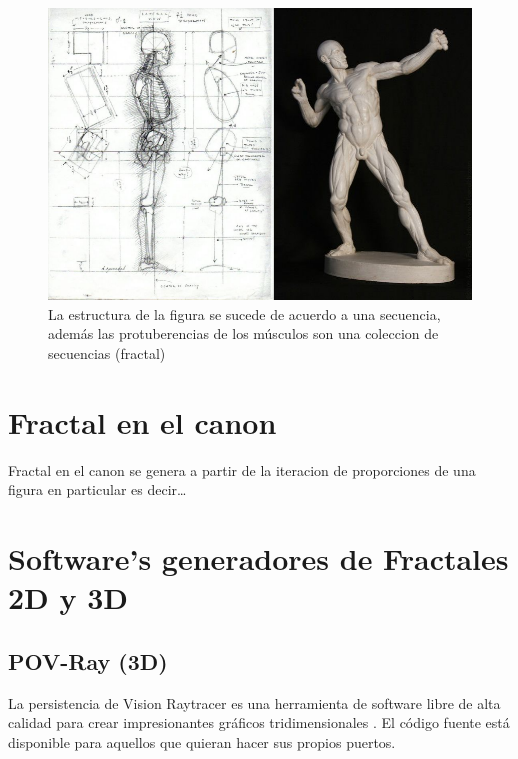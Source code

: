 \documentclass[
  11pt,
]{krantz}
\theoremstyle{definition}
\theoremstyle{definition}
\theoremstyle{definition}
\theoremstyle{definition}
\theoremstyle{remark}
\begin{document}
\begin{figure}[!ht]

{\centering \includegraphics[width=1\linewidth]{body2} 

}

\caption{La estructura de la figura se sucede de acuerdo a una secuencia, además las protuberencias de los músculos son una coleccion de secuencias (fractal)}\label{fig:body2}
\end{figure}

\hypertarget{fractal-en-el-canon}{%
\section{Fractal en el canon}\label{fractal-en-el-canon}}

Fractal en el canon se genera a partir de la iteracion de proporciones de una figura en particular es decir\ldots{}

\hypertarget{softwares-generadores-de-fractales-2d-y-3d}{%
\section{Software's generadores de Fractales 2D y 3D}\label{softwares-generadores-de-fractales-2d-y-3d}}

\hypertarget{pov-ray-3d}{%
\subsection{POV-Ray (3D)}\label{pov-ray-3d}}

La persistencia de Vision Raytracer es una herramienta de software libre de alta calidad para crear impresionantes gráficos tridimensionales . El código fuente está disponible para aquellos que quieran hacer sus propios puertos.
\end{document}
